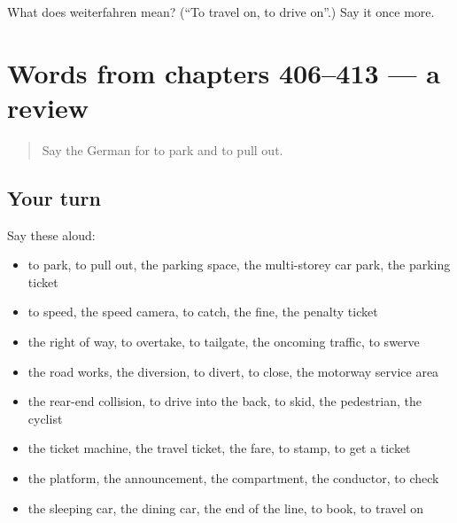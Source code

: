 \begin{tcolorbox}[breakable,colback=teal!4,colframe=teal!35!black,title={Before you move on}]
What does weiterfahren mean? (\textquotedblleft{}To travel on, to drive on\textquotedblright{}.) Say it once more.
\end{tcolorbox}
\section[(dialogue)]{Words from chapters 406–413 — a review}

\label{lesson:GE-R413-review-406-413}



\begin{quote}
Say the German for to park and to pull out.
\end{quote}

\subsection*{Your turn}
Say these aloud:

\begin{itemize}
\raggedright
  \item to park, to pull out, the parking space, the multi-storey car park, the parking ticket
  \item to speed, the speed camera, to catch, the fine, the penalty ticket
  \item the right of way, to overtake, to tailgate, the oncoming traffic, to swerve
  \item the road works, the diversion, to divert, to close, the motorway service area
  \item the rear-end collision, to drive into the back, to skid, the pedestrian, the cyclist
  \item the ticket machine, the travel ticket, the fare, to stamp, to get a ticket
  \item the platform, the announcement, the compartment, the conductor, to check
  \item the sleeping car, the dining car, the end of the line, to book, to travel on
\end{itemize}

